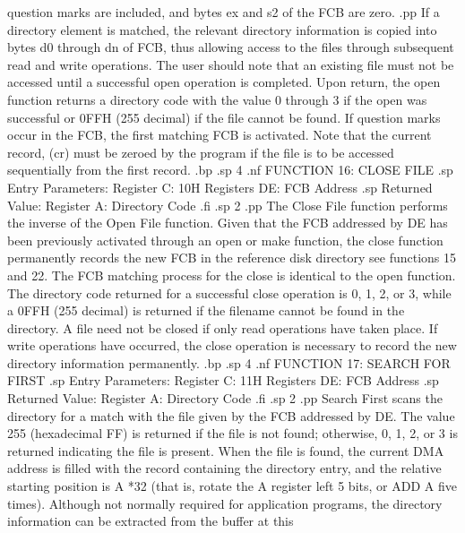 question marks are included, and bytes ex and s2 of the FCB are 
zero.
.pp
If a directory element is matched, the relevant directory 
information is copied into bytes d0 through dn of FCB, thus 
allowing access to the files through subsequent read and write 
operations.  The user should note that an existing file must not 
be accessed until a successful open operation is completed.  Upon 
return, the open function returns a directory code with the value 
0 through 3 if the open was successful or 0FFH (255 decimal) if 
the file cannot be found.  If question marks occur in the FCB, 
the first matching FCB is activated.  Note that the current 
record, (cr) must be zeroed by the program if the file is to be 
accessed sequentially from the first record.
.bp
.sp 4
.nf
                    FUNCTION 16:  CLOSE FILE
.sp
             Entry Parameters:
                   Register C:  10H
                 Registers DE:  FCB Address
.sp
             Returned Value:
                  Register  A:  Directory Code
.fi
.sp 2
.pp
The Close File function performs the inverse of the Open File 
function.  Given that the FCB addressed by DE has been previously 
activated through an open or make function,  the close function 
permanently records the new FCB in the reference disk directory 
see functions 15 and 22.  The FCB matching process for the close 
is identical to the open function.  The directory code returned 
for a successful close operation is 0, 1, 2, or 3, while a 0FFH 
(255 decimal) is returned if the filename cannot be found in the 
directory.  A file need not be closed if only read operations 
have taken place.  If write operations have occurred, the close 
operation is necessary to record the new directory information 
permanently.
.bp
.sp 4
.nf
                    FUNCTION 17:  SEARCH FOR FIRST
.sp
               Entry Parameters:
                     Register C:  11H
                   Registers DE:  FCB Address
.sp
               Returned Value:
                    Register  A:  Directory Code
.fi
.sp 2
.pp
Search First scans the directory for a match with the file given 
by the FCB addressed by DE.  The value 255 (hexadecimal FF) is 
returned if the file is not found; otherwise, 0, 1, 2, or 3 is 
returned indicating the file is present.  When the file is found,
the current DMA address is filled with the record containing the 
directory entry, and the relative starting position is A *32 
(that is, rotate the A register left 5 bits, or ADD A five times).  
Although not normally required for application programs, the 
directory information can be extracted from the buffer at this 
